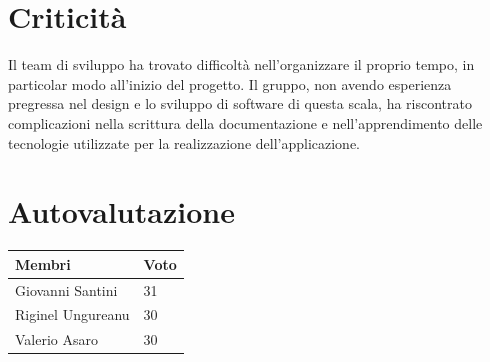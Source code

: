 \documentclass{report}
\begin{document}
\section{Criticità}
Il team di sviluppo ha trovato difficoltà nell'organizzare il proprio tempo, in particolar modo all'inizio del progetto. Il gruppo, non avendo esperienza pregressa nel design e lo sviluppo di software di questa scala, ha riscontrato complicazioni nella scrittura della documentazione e nell'apprendimento delle tecnologie utilizzate per la realizzazione dell'applicazione.

\section{Autovalutazione}

\begin{center} %
	\centering
	\begin{tabular}{ |p{3cm}|p{1cm}|  }
		\hline
		\centering  Membri  & Voto\\ %
		\hline
		\centering Giovanni Santini & 31 \\
		\hline
		\centering Riginel Ungureanu & 30  \\
		\hline
		\centering Valerio Asaro & 30  \\
		\hline
	\end{tabular}
\end{center}



	
\end{document}
